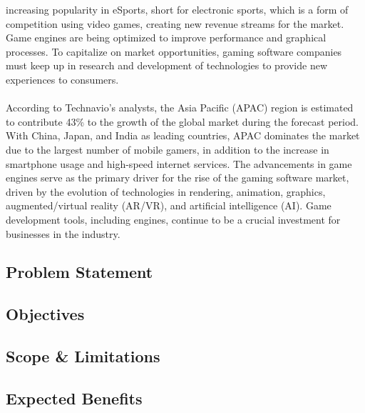 increasing popularity in eSports, short for electronic sports, which is a form of competition using video games, creating new 
revenue streams for the market.
Game engines are being optimized to improve performance and graphical processes. To capitalize on market opportunities, gaming 
software companies must keep up in research and development of technologies to provide new experiences to consumers.
\\\\
According to Technavio’s analysts, the Asia Pacific (APAC) region is estimated to contribute 43\% to the growth of the global 
market during the forecast period.
With China, Japan, and India as leading countries, APAC dominates the market due to the largest number of mobile gamers, 
in addition to the increase in smartphone usage and high-speed internet services.
The advancements in game engines serve as the primary driver for the rise of the gaming software market, driven by the 
evolution of technologies in rendering, animation, graphics, augmented/virtual reality (AR/VR), and artificial intelligence (AI).
Game development tools, including engines, continue to be a crucial investment for businesses in the industry.

\subsection{Problem Statement}
\label{subsec:problem-statement}

\subsection{Objectives}
\label{subsec:objectives}

\subsection{Scope \& Limitations}
\label{subsec:scope-and-limitation}

\subsection{Expected Benefits}
\label{subsec:expected-benefits}